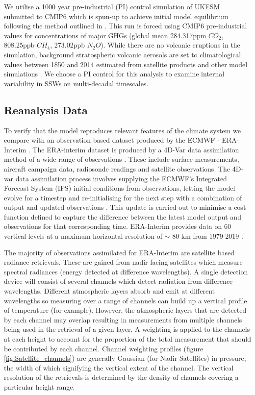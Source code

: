 We utilise a 1000 year pre-industrial (PI) control simulation of UKESM submitted to CMIP6 which is spun-up to achieve initial model equilibrium following the method outlined in \cite{Yool20}. This run is forced using CMIP6 pre-industrial values for concentrations of major GHGs (global mean 284.317ppm $CO_2$, 808.25ppb $CH_4$, 273.02ppb $N_2O$). While there are no volcanic eruptions in the simulation, background stratospheric volcanic aerosols are set to climatological values between 1850 and 2014 estimated from satellite products and other model simulations \citep{Menary2018}. We choose a PI control for this analysis to examine internal variability in SSWs on multi-decadal timescales. 


\subsection{Reanalysis Data}
To verify that the model reproduces relevant features of the climate system we compare with an observation based dataset produced by the ECMWF - ERA-Interim \cite{Dee2011}. The ERA-interim dataset is produced by a 4D-Var data assimilation method of a wide range of observations \citep{Uppala2005}. These include surface measurements, aircraft campaign data, radiosonde readings and satellite observations. The 4D-var data assimilation process involves supplying the ECMWF’s Integrated Forecast System (IFS) initial conditions from observations, letting the model evolve for a timestep and re-initialising for the next step with a combination of output and updated observations \citep{Courtier1998, Bouttier2001}. This update is carried out to minimise a cost function defined to capture the difference between the latest model output and observations for that corresponding time. ERA-Interim provides data on 60 vertical levels at a maximum horizontal resolution of $\sim$ 80 km from 1979-2019 \citep{Berrisford}.

The majority of observations assimilated for ERA-Interim are satellite based radiance retrievals. These are gained from nadir facing satellites which measure spectral radiances (energy detected at difference wavelengths). A single detection device will consist of several channels which detect radiation from difference wavelengths. Different atmospheric layers absorb and emit at different wavelengths so measuring over a range of channels can build up a vertical profile of temperature (for example). However, the atmospheric layers that are detected by each channel may overlap resulting in measurements from multiple channels being used in the retrieval of a given layer. A weighting is applied to the channels at each height to account for the proportion of the total measurement that should be contributed by each channel. Channel weighting profiles (figure \ref{fig:Satellite_channels}) \citep{Fujiwara17} are generally Gaussian (for Nadir Satellites) in pressure, the width of which signifying the vertical extent of the channel. The vertical resolution of the retrievals is determined by the density of channels covering a particular height range. 

